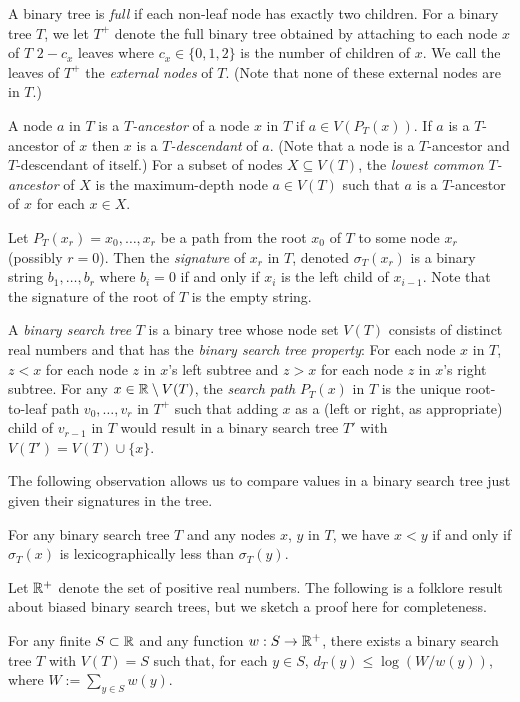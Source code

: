 \documentclass[kpfonts]{patmorin}
\let\le\leqslant
\begin{document}
A binary tree is \emph{full} if each non-leaf node has exactly two children. For a binary tree $T$, we let $T^+$ denote the full binary tree obtained by attaching to each node $x$ of $T$ $2-c_x$ leaves where $c_x \in\{0,1,2\}$ is the number of children of $x$.  We call the leaves of $T^+$ the \emph{external nodes} of $T$.  (Note that none of these external nodes are in $T$.)

A node $a$ in $T$ is a \emph{$T$-ancestor} of a node $x$ in $T$ if $a\in V(P_T(x))$. If $a$ is a $T$-ancestor of $x$ then $x$ is a \emph{$T$-descendant} of $a$. (Note that a node is a $T$-ancestor and $T$-descendant of itself.)  For a subset of nodes $X\subseteq V(T)$, the \emph{lowest common $T$-ancestor} of $X$ is the maximum-depth node $a\in V(T)$ such that $a$ is a $T$-ancestor of $x$ for each $x\in X$.

Let $P_T(x_r)=x_0,\ldots,x_{r}$ be a path from the root $x_0$ of $T$ to some node $x_r$ (possibly $r=0$).  Then the \emph{signature} of $x_r$ in $T$, denoted $\sigma_T(x_r)$ is a binary string $b_1,\ldots,b_r$ where $b_i=0$ if and only if $x_{i}$ is the left child of $x_{i-1}$.
Note that the signature of the root of $T$ is the empty string.

A \emph{binary search tree} $T$ is a binary tree whose node set $V(T)$ consists of distinct real numbers and that has the \emph{binary search tree property}:  For each node $x$ in $T$, $z<x$ for each node $z$ in $x$'s left subtree and $z>x$ for each node $z$ in $x$'s right subtree. For any $x\in\mathbb{R}\setminus V(T)$, the \emph{search path} $P_T(x)$ in $T$ is the unique root-to-leaf path $v_0,\ldots,v_r$ in $T^+$ such that adding $x$ as a (left or right, as appropriate) child of $v_{r-1}$ in $T$ would result in a binary search tree $T'$ with $V(T')=V(T)\cup\{x\}$.

The following observation allows us to compare values in a binary search tree just given their signatures in the tree.

\begin{obs}
  For any binary search tree $T$ and any nodes $x$, $y$ in $T$, we have $x<y$ if and only if $\sigma_T(x)$ is lexicographically less than $\sigma_T(y)$.
\end{obs}

Let $\mathbb{R}^+$ denote the set of positive real numbers. The following is a folklore result about biased binary search trees, but we sketch a proof here for completeness.

\begin{lem}
  For any finite $S\subset \mathbb{R}$ and any function $w:S\to\mathbb{R}^+$, there exists a binary search tree $T$ with $V(T)=S$ such that, for each $y\in S$, $d_T(y)\le\log(W/w(y))$, where $W:=\sum_{y\in S} w(y)$.
\end{lem}
\end{document}
